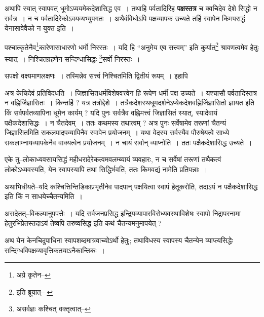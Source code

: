 \documentclass[article,12pt,a4paper]{memoir}
\begin{document}
	  \pstart अथापि स्यात् स्वापवत् धूमोऽप्ययमेकदेशासिद्ध एव । तथाहि पर्वतादिरिह \textbf{पक्षस्तत्र} च क्वचिदेव देशे सिद्धो न सर्वत्र । न च पर्वतादिरेकोऽवयव्यभ्युपगतः । अथैवंविधोऽपि पक्षव्यापक उच्यते तर्हि स्वापेन किमपराद्धं येनासावेवैको न युक्त इति ।
	\pend
      \leavevmode{}
	  \bigskip
	  \begingroup
	

	  \pstart पश्चात्कृतेनैव\footnote{अग्रे कृतेन--\cite{dp-msD-n}}कारेणासाधारणो धर्मो निरस्तः । यदि हि “अनुमेय एव सत्त्वम्” इति कुर्यात्\footnote{इति ब्रूयात्--\cite{dp-msB} \cite{dp-msD}} श्रावणत्वमेव हेतुः स्यात् । निश्चितग्रहणेन सन्दिग्धासिद्धः \footnote{असर्वज्ञः कश्चित् वक्तृत्वात्--\cite{dp-msD-n}}सर्वो निरस्तः ।
	\pend
       

	  \pstart सपक्षो वक्ष्यमाणलक्षणः । तस्मिन्नेव सत्त्वं निश्चितमिति द्वितीयं रूपम् । इहापि
	\pend
      
	  \endgroup
	

	  \pstart अत्र केचिदेवं प्रतिविदधति । जिज्ञासितधर्मविशेषवत्त्वेन हि रूपेण धर्मी पक्ष उच्यते । यश्चासौ पर्वतादिस्तत्र न वह्निर्जिज्ञासितः । किन्तर्हि ? यत्र तत्रोद्देशे । तत्रैकदेशस्थधूमदर्शनेऽप्येकदेशवह्निर्जिज्ञासितो ज्ञायत इति किं सर्वपर्वतव्यापिना धूमेन कार्यम् ? यदि पुनः सर्वत्रैव वह्निमत्त्वं जिज्ञासितं स्यात्, स्यादेवायं पक्षैकदेशासिद्धः । न चैतदेवम् । ततः कथमस्य तथात्वम् ? अत्र पुनः सर्वेषामेव तरूणां चैतन्यं जिज्ञासितमिति सकलपादपव्यापिनैव स्वापेन प्रयोजनम् । यथा वेदस्य सर्वस्यैव पौरुषेयत्वे साध्ये सकलाम्नायव्यापकेनैव वाक्यत्वेन प्रयोजनम् । न चायं सर्वान् व्याप्नोति । ततः पक्षैकदेशासिद्ध उच्यते ।
	\pend
      

	  \pstart एके तु--लोकाध्यवसायसिद्धं महीधरादेरेकत्वमवलम्ब्यायं व्यवहारः, न च सर्वेषां तरूणां तथैकत्वं लोकोऽध्यवस्यति, येन स्वापस्यापि तथा सिद्धिर्भवति, ततः किमवद्यं नामेति प्रतिपन्नाः ।
	\pend
      

	  \pstart अथाभिधीयते--यदि कश्चित्तिन्तिडिकाप्रभृतीनेव पादपान् पक्षयित्वा स्वापं हेतूकरोति, तदाऽयं न पक्षैकदेशासिद्ध इति किं न साधयेच्चैतन्यमिति ।
	\pend
      

	  \pstart असदेतत्--विकल्पानुपपत्तेः । यदि सर्वजनप्रसिद्ध इन्द्रियव्यापारविरोध्यवस्थाविशेषः स्वापो निद्रापरनामा हेतुरभिप्रेतस्तदाऽयं तेष्वपि तरुष्वसिद्ध इति कथं चैतन्यमनुमापयेत् ?
	\pend
      

	  \pstart अथ येन केनचिदुपाधिना स्वापशब्दमात्रवाच्योऽर्थो हेतुः; तथाविधस्य स्वापस्य चैतन्येन व्याप्त्यसिद्धेः सन्दिग्धविपक्षव्यावृत्तिकतयाऽनैकान्तिकः ।
	\pend
      
\end{document}
